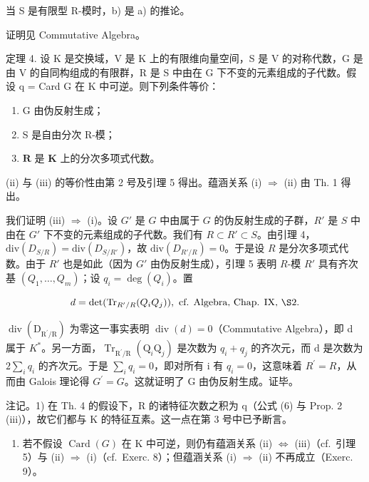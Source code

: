 当 S 是有限型 R-模时，b) 是 a) 的推论。

证明见 Commutative Algebra。

定理 4. 设 K 是交换域，V 是 K 上的有限维向量空间，S 是 V 的对称代数，G 是由 V 的自同构组成的有限群，R 是 S 中由在 G 下不变的元素组成的子代数。假设 q = Card G 在 K 中可逆。则下列条件等价：

\begin{enumerate}
\def\labelenumi{(\roman{enumi})}
\item
  G 由伪反射生成；
\item
  S 是自由分次 R-模；
\item
  \(\mathbf{R}\) 是 \(\mathbf{K}\) 上的分次多项式代数。
\end{enumerate}

(ii) 与 (iii) 的等价性由第 2 号及引理 5 得出。蕴涵关系 (i) \(\Longrightarrow\) (ii) 由 Th. 1 得出。

我们证明 (iii) \(\Longrightarrow\) (i)。设 \(G'\) 是 \(G\) 中由属于 \(G\) 的伪反射生成的子群，\(R'\) 是 \(S\) 中由在 \(G'\) 下不变的元素组成的子代数。我们有 \(R \subset R' \subset S\)。由引理 4，\(\text{div}(D_{S/R}) = \text{div}(D_{S/R'})\)，故 \(\text{div}(D_{R'/R}) = 0\)。于是设 \(R\) 是分次多项式代数。由于 \(R'\) 也是如此（因为 \(G'\) 由伪反射生成），引理 5 表明 \(R\)-模 \(R'\) 具有齐次基 \((Q_1, \ldots, Q_m)\)；设 \(q_i = \deg(Q_i)\)。置

\[
d = \det (\mathrm{Tr} _ {R ^ {\prime} / R} (Q _ {i} Q _ {j})), \text { cf.   Algebra,   Chap.   IX, } \S 2.
\]

\(\operatorname{div}(\mathrm{D}_{\mathrm{R}^{\prime}/\mathrm{R}})\) 为零这一事实表明 \(\operatorname{div}(d)=0\)（Commutative Algebra），即 d 属于 \(K^{*}\)。另一方面，\(\operatorname{Tr}_{\mathrm{R}^{\prime}/\mathrm{R}}(\mathrm{Q}_{i}\mathrm{Q}_{j})\) 是次数为 \(q_{i}+q_{j}\) 的齐次元，而 d 是次数为 \(2\sum_{i}q_{i}\) 的齐次元。于是 \(\sum_{i}q_{i}=0\)，即对所有 i 有 \(q_{i}=0\)，这意味着 \(R^{\prime}=R\)，从而由 Galois 理论得 \(G^{\prime}=G\)。这就证明了 G 由伪反射生成。证毕。

注记。1) 在 Th. 4 的假设下，R 的诸特征次数之积为 q（公式 (6) 与 Prop. 2 (iii)），故它们都与 K 的特征互素。这一点在第 3 号中已予断言。

\begin{enumerate}
\def\labelenumi{\arabic{enumi})}
\setcounter{enumi}{1}
\tightlist
\item
  若不假设 \(\operatorname{Card}(G)\) 在 K 中可逆，则仍有蕴涵关系 (ii) \(\Longleftrightarrow\) (iii)（cf.~引理 5）与 (ii) \(\Longrightarrow\) (i)（cf.~Exerc. 8）；但蕴涵关系 (i) \(\Longrightarrow\) (ii) 不再成立（Exerc. 9）。
\end{enumerate}

